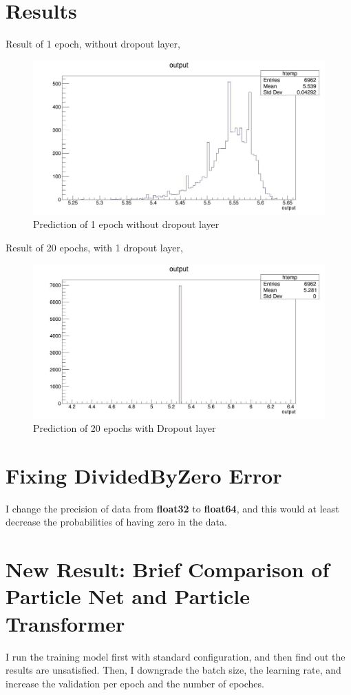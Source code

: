 \documentclass[12pt]{article}
\numberwithin{equation}{section}
\begin{document}
\section{Results}
Result of 1 epoch, without dropout layer,
\begin{figure}[H]
    \centering
    \includegraphics[width=0.75\linewidth]{figures/prediction.jpg}
    \caption{Prediction of 1 epoch without dropout layer}
    \label{}
\end{figure}
Result of 20 epochs, with 1 dropout layer,
\begin{figure}[H]
    \centering
    \includegraphics[width=0.75\linewidth]{figures/prediction20epochs.jpg}
    \caption{Prediction of 20 epochs with Dropout layer}
    \label{}
\end{figure}

\section{Fixing DividedByZero Error}
I change the precision of data from \textbf{float32} to \textbf{float64}, and this would at least decrease the probabilities of having zero in the data.

\section{New Result: Brief Comparison of Particle Net and Particle Transformer}
I run the training model first with standard configuration, and then find out the results are unsatisfied.
Then, I downgrade the batch size, the learning rate, and increase the validation per epoch and the number of epoches.
\end{document}
